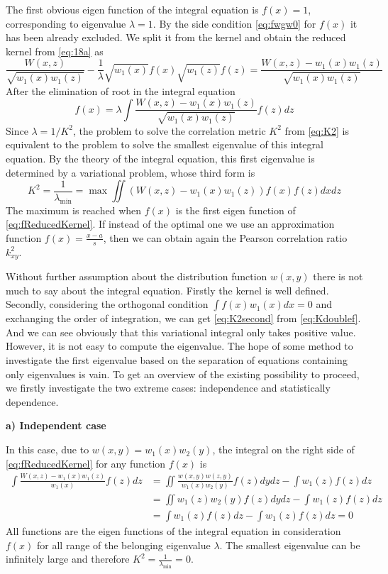 \documentclass{article}
\begin{document}
The first obvious eigen function of the integral equation
is $f(x)=1$, corresponding to eigenvalue $\lambda=1$.
By the side condition \eqref{eq:fwgw0} for $f(x)$ it
has been already excluded.
We split it from the kernel and obtain the reduced kernel from \eqref{eq:18a} as
$$
\frac{W(x,z)}{\sqrt{w_1(x) w_1(z)}}
- \frac{1}{\lambda} \sqrt{w_1(x)} f(x) \sqrt{w_1(z)}f(z)
= \frac{W(x,z) - w_1(x) w_1(z)}{\sqrt{w_1(x) w_1(z)}}
$$
After the elimination of root in the integral equation
\begin{equation}\label{eq:fReducedKernel}
    f(x)=\lambda \int \frac{W(x,z) - w_1(x) w_1(z)}{\sqrt{w_1(x) w_1(z)}} f(z)dz
\end{equation}
Since $\lambda = 1/K^2$, the problem to solve the correlation metric $K^2$ from \eqref{eq:K2}
is equivalent to the problem to solve the smallest eigenvalue of this
integral equation. By the theory of the integral equation,
this first eigenvalue is determined by a variational problem, whose
third form is
\begin{equation}\label{eq:Kdoublef}
    K^2 = \frac{1}{\lambda_{\min}}
    = \max\iint(W(x,z) - w_1(x)w_1(z))f(x)f(z) dxdz
\end{equation}
The maximum is reached when $f(x)$ is the first eigen function
of \eqref{eq:fReducedKernel}.
If instead of the optimal one we use an approximation function
$f(x) = \frac{x-a}{s}$, then we can obtain again the Pearson
correlation ratio $k^2_{xy}$.

Without further assumption about the distribution function
$w(x,y)$ there is not much to say about the integral equation.
Firstly the kernel is well defined. Secondly, considering
the orthogonal condition $\int f(x)w_1(x)dx=0$
and exchanging the order of integration, we can get
\eqref{eq:K2second} from \eqref{eq:Kdoublef}. And we can see
obviously that this variational integral only takes positive
value. However, it is not easy to compute the eigenvalue.
The hope of some method to investigate the first eigenvalue
based on the separation of equations containing only eigenvalues is vain. To get an overview of the existing possibility to proceed,
we firstly investigate the two extreme cases: independence
and statistically dependence.

\textbf{a) Independent case}

In this case, due to $w(x,y) = w_1(x) w_2(y)$, the integral
on the right side of \eqref{eq:fReducedKernel} for any function
$f(x)$ is
\begin{align*}
    \int \frac{W(x,z) - w_1(x) w_1(z)}{w_1(x)}
    f(z) dz
    &= \iint \frac{w(x,y) w(z,y)}{w_1(x)w_2(y)} f(z) dy dz- \int w_1(z) f(z) dz \\
    &= \iint w_1(z) w_2(y) f(z) dydz
    - \int w_1(z) f(z) dz \\
    &= \int w_1(z) f(z) dz-\int w_1(z) f(z) dz=0
\end{align*}
All functions are the eigen functions of the integral equation in consideration $f(x)$ for all range of the belonging eigenvalue $\lambda$.
The smallest eigenvalue can be infinitely large and therefore
$K^2 = \frac{1}{\lambda_{\min}} = 0$.
\end{document}

